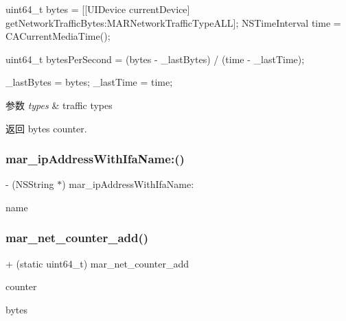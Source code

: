 uint64\+\_\+t bytes = \mbox{[}\mbox{[}U\+I\+Device current\+Device\mbox{]} get\+Network\+Traffic\+Bytes\+:M\+A\+R\+Network\+Traffic\+Type\+A\+LL\mbox{]}; N\+S\+Time\+Interval time = C\+A\+Current\+Media\+Time();

uint64\+\_\+t bytes\+Per\+Second = (bytes -\/ \+\_\+last\+Bytes) / (time -\/ \+\_\+last\+Time);

\+\_\+last\+Bytes = bytes; \+\_\+last\+Time = time;


\begin{DoxyParams}{参数}
{\em types} & traffic types \\
\hline
\end{DoxyParams}
\begin{DoxyReturn}{返回}
bytes counter. 
\end{DoxyReturn}
\mbox{\label{category_u_i_device_07_m_a_r_e_x_08_a08b5414b423d4e3df4e4e89185f7d239}} 
\subsubsection{\texorpdfstring{mar\+\_\+ip\+Address\+With\+Ifa\+Name\+:()}{mar\_ipAddressWithIfaName:()}}
{\footnotesize\ttfamily -\/ (N\+S\+String $\ast$) mar\+\_\+ip\+Address\+With\+Ifa\+Name\+: \begin{DoxyParamCaption}\item[{(N\+S\+String $\ast$)}]{name }\end{DoxyParamCaption}\hspace{0.3cm}{\ttfamily [implementation]}}

\mbox{\label{category_u_i_device_07_m_a_r_e_x_08_aea1f85cddfeb5c77009673b1da0c8d2b}} 
\subsubsection{\texorpdfstring{mar\+\_\+net\+\_\+counter\+\_\+add()}{mar\_net\_counter\_add()}}
{\footnotesize\ttfamily + (static uint64\+\_\+t) mar\+\_\+net\+\_\+counter\+\_\+add \begin{DoxyParamCaption}\item[{(uint64\+\_\+t)}]{counter }\item[{(uint64\+\_\+t)}]{bytes }\end{DoxyParamCaption}\hspace{0.3cm}{\ttfamily [implementation]}}

